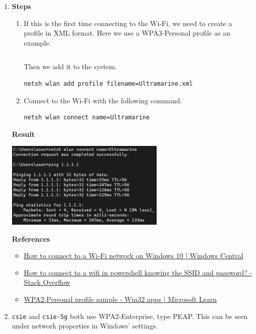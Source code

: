 \documentclass[12pt, a4paper]{article}
\begin{document}
  \begin{enumerate}[label=(\alph*)]
    \item \textbf{Steps}
    \begin{enumerate}[label=(\arabic*)]
      \item If this is the first time connecting to the Wi-Fi, we need to create a profile in
      XML format. Here we use a WPA3-Personal profile as an example.
      \inputminted[fontsize=\footnotesize]{xml}{Ultramarine.xml}
      Then we add it to the system.
      \begin{Verbatim}[frame=single]
netsh wlan add profile filename=Ultramarine.xml
      \end{Verbatim}
      \item Connect to the Wi-Fi with the following command.
      \begin{Verbatim}[frame=single]
netsh wlan connect name=Ultramarine
      \end{Verbatim}
    \end{enumerate}
    \textbf{Result}

    \includegraphics[width=0.6\textwidth]{4-a_netsh.png}

    \pagebreak
    \textbf{References}
    \begin{itemize}
      \item \href{https://www.windowscentral.com/how-connect-wi-fi-network-windows-10}{How to connect to a Wi-Fi network on Windows 10 | Windows Central}
      \item \href{https://stackoverflow.com/questions/32760356/how-to-connect-to-a-wifi-in-powershell-knowing-the-ssid-and-password}{How to connect to a wifi in powershell knowing the SSID and password? - Stack Overflow}
      \item \href{https://learn.microsoft.com/en-us/windows/win32/nativewifi/wpa2-personal-profile-sample}{WPA2-Personal profile sample - Win32 apps | Microsoft Learn}
    \end{itemize}

    \item \verb|csie| and \verb|csie-5g| both use WPA2-Enterprise, type PEAP. This can be seen
    under network properties in Windows' settings.


\end{enumerate}
\end{document}
